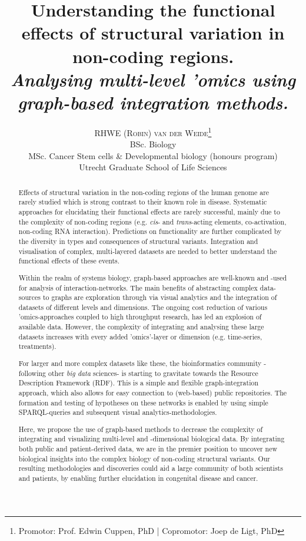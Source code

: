 \documentclass[twoside,fontsize=12pt]{article}
\title{\vspace{-15mm}\fontsize{18pt}{10pt}\normalfont\textbf{Understanding the functional effects of structural variation in non-coding regions.\\ \vspace{4 mm} {{\footnotesize \textit{Analysing multi-level 'omics using graph-based integration methods.}}}}} %
\author{
\large
\textsc {RHWE (Robin) van der Weide}\thanks{Promotor: Prof. Edwin Cuppen, PhD | Copromotor: Joep de Ligt, PhD}\\[2mm] 
\normalsize  BSc. Biology\\
\normalsize  MSc. Cancer Stem cells \& Developmental biology (honours program)\\
\normalsize  Utrecht Graduate School of Life Sciences \\
\vspace{-5mm}
}
\date{}
\renewcommand{\abstractname}{}    %
\begin{document}
\maketitle %
\thispagestyle{fancy} %

\newpage
\renewcommand{\abstractname}{\begin{center}
Summary of the research
\end{center}}    %

\begin{abstract}
\noindent
Effects of structural variation in the non-coding regions of the human genome are rarely studied which is strong contrast to their known role in disease\cite{Weischenfeldt2013}. Systematic approaches for elucidating their functional effects are rarely successful, mainly due to the complexity of non-coding regions (e.g. \textit{cis}- and \textit{trans}-acting elements, co-activation, non-coding RNA interaction). Predictions on functionality are further complicated by the diversity in types and consequences of structural variants. Integration and visualisation of complex, multi-layered datasets are needed to better understand the functional effects of these events\cite{Munoz2011}.
\medskip

\noindent 
Within the realm of systems biology, graph-based approaches are well-known and -used for analysis of interaction-networks. The main benefits of abstracting complex data-sources to graphs are exploration through via visual analytics and the integration of datasets of different levels and dimensions. The ongoing cost reduction of various 'omics-approaches coupled to high throughput research, has led an explosion of available data. However, the complexity of integrating and analysing these large datasets increases with every added 'omics'-layer or dimension (e.g. time-series, treatments). 

For larger and more complex datasets like these, the bioinformatics community -following other \textit{big data} sciences- is starting to gravitate towards the Resource Description Framework (RDF). This is a simple and flexible graph-integration approach, which also allows for easy connection to (web-based) public repositories. The formation and testing of hypotheses on these  networks is enabled by using simple SPARQL-queries and subsequent visual analytics-methodologies.
\medskip

\noindent Here, we propose the use of graph-based methods to decrease the complexity of integrating and visualizing multi-level and -dimensional biological data. By integrating both public and patient-derived data, we are in the premier position to uncover new biological insights into the complex biology of non-coding structural variants. Our resulting methodologies and discoveries could aid a large community of both scientists and patients, by enabling further elucidation in congenital disease and cancer. 
\end{abstract}
\medskip
\end{document}
